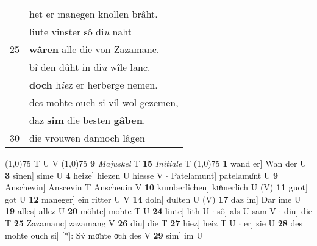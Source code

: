 \documentclass[8pt,a4paper,notitlepage]{article}
\begin{document}
\begin{table}[ht]
\begin{minipage}[t]{0.5\linewidth}
\begin{tabular}{rl}
 & het er manegen knollen brâht.\\ 
 & liute vinster sô di\textit{u} naht\\ 
25 & \textbf{wâren} alle die von Zazamanc.\\ 
 & bî den dûht in di\textit{u} wîle lanc.\\ 
 & \textbf{doch} h\textit{ie}z er herberge nemen.\\ 
 & des mohte ouch si vil wol gezemen,\\ 
 & daz \textbf{sim} die besten \textbf{gâben}.\\ 
30 & die vrouwen dannoch lâgen\\ 
\end{tabular}
\scriptsize
\line(1,0){75} \newline
T U V \newline
\line(1,0){75} \newline
\textbf{9} \textit{Majuskel} T  \textbf{15} \textit{Initiale} T  \newline
\line(1,0){75} \newline
\textbf{1} wand er] Wan der U \textbf{3} sînen] sime U \textbf{4} heize] hiezen U hiesse V  $\cdot$ Patelamunt] patelamuͦnt U \textbf{9} Anschevin] Anscevin T Anscheuin V \textbf{10} kumberlîchen] kuͦmerlich U (V) \textbf{11} guot] got U \textbf{12} maneger] ein ritter U V \textbf{14} doln] dulten U (V) \textbf{17} daz im] Dar ime U \textbf{19} alles] allez U \textbf{20} möhte] mohte T U \textbf{24} liute] lith U  $\cdot$ sô] als U sam V  $\cdot$ diu] die T \textbf{25} Zazamanc] zazamang V \textbf{26} diu] die T \textbf{27} hiez] heiz T U  $\cdot$ er] sie U \textbf{28} des mohte ouch si] [*]: Sv́ moͤhte oͮch des V \textbf{29} sim] im U \newline
\end{minipage}
\end{table}
\end{document}
